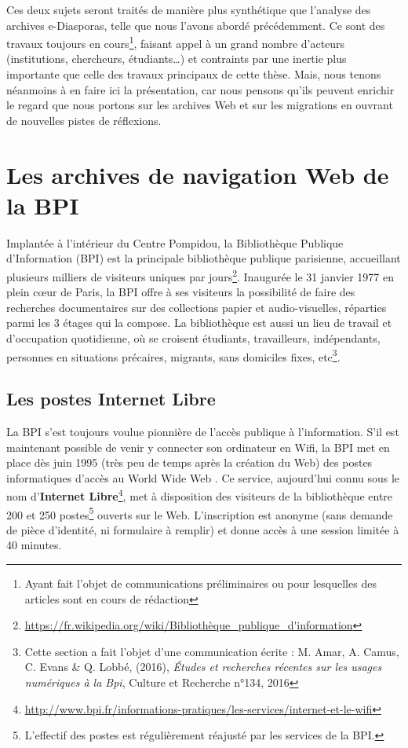 \documentclass[symmetric,justified,marginals=raggedouter]{tufte-book}
\begin{document}
Ces deux sujets seront traités de manière plus synthétique que l'ana\-lyse des archives e-Diasporas, telle que nous l'avons abordé précédemment. Ce sont des travaux toujours en cours\footnote{\RaggedOuter Ayant fait l'objet de communications préliminaires ou pour lesquelles des articles sont en cours de rédaction}, faisant appel à un grand nombre d'acteurs (institutions, chercheurs, étudiants\ldots{}) et contraints par une inertie plus importante que celle des travaux principaux de cette thèse. Mais, nous tenons néanmoins à en faire ici la présentation, car nous pensons qu'ils peuvent enrichir le regard que nous portons sur les archives Web et sur les migrations en ouvrant de nouvelles pistes de réflexions.   

\section{Les archives de navigation Web de la BPI}
\label{sec:7_bpi}

\noindent Implantée à l'intérieur du Centre Pompidou, la Bibliothèque Publique d'Information (BPI) est la principale bibliothèque publique parisienne, accueillant plusieurs milliers de visiteurs uniques par jours\footnote{\RaggedOuter \url{https://fr.wikipedia.org/wiki/Bibliothèque\_publique\_d'information}}. Inaugurée le 31 janvier 1977 en plein cœur de Paris, la BPI offre à ses visiteurs la possibilité de faire des recherches documentaires sur des collections papier et audio-visuelles, réparties parmi les 3 étages qui la compose. La bibliothèque est aussi un lieu de travail et d'occupation quotidienne, où se croisent étudiants, travailleurs, indépendants, personnes en situations précaires, migrants, sans domiciles fixes, etc\footnote{\RaggedOuter Cette section a fait l'objet d'une communication écrite : M. Amar, A. Camus, C. Evans \& Q. Lobbé, (2016), \textit{Études et recherches récentes sur les usages numériques à la Bpi}, Culture et Recherche n°134, 2016}.  

\subsection{Les postes Internet Libre}

\noindent La BPI s'est toujours voulue pionnière de l'accès publique à l'informa\-tion. S'il est maintenant possible de venir y connecter son ordinateur en Wifi, la BPI met en place dès juin 1995 (très peu de temps après la création du Web) des postes informatiques d'accès au World Wide Web \citep{amar_les_2008}. Ce service, aujourd'hui connu sous le nom d'\textbf{Internet Libre}\footnote{\RaggedOuter \url{http://www.bpi.fr/informations-pratiques/les-services/internet-et-le-wifi}}, met à disposition des visiteurs de la bibliothèque entre 200 et 250 postes\footnote{\RaggedOuter L'effectif des postes est régulièrement réajusté par les services de la BPI.} ouverts sur le Web. L'inscription est anonyme (sans demande de pièce d'identité, ni formulaire à remplir) et donne accès à une session limitée à 40 minutes.
\end{document}
